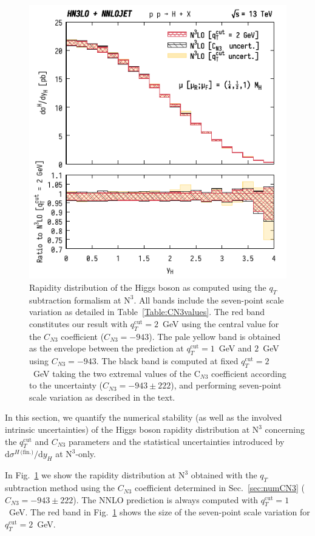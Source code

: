\documentclass[12pt]{article}
\DeclareRobustCommand{\qt}{\ensuremath{q_T}\xspace}
\DeclareRobustCommand{\qtcut}{\ensuremath{q_T^\mathrm{cut}}\xspace}
\DeclareRobustCommand{\rd}{\ensuremath{\mathrm{d}}}
\DeclareRobustCommand{\fin}{\text{(fin.)}\xspace}
\DeclareRobustCommand{\LO}{\text{LO}\xspace}
\DeclareRobustCommand{\N}[1]{\ensuremath{\text{N}^{#1}}} %
\begin{document}
\begin{figure}[tbh]
\centering
\includegraphics[width=.6\linewidth]{./JHEP_figures/yH_B02_only_N3LO_qTcut_uncert_CN3_uncert}
\caption{\label{fig:yHN3LOonly}{Rapidity distribution of the Higgs boson as computed using the $\qt$ subtraction formalism at \N3\LO. All bands include the seven-point scale variation as detailed in Table~\ref{Table:CN3values}. The red band constitutes our result with $\qtcut=2$~GeV using the central value for the $C_{N3}$ coefficient ($C_{N3}=-943$). The pale yellow band is obtained as the envelope between the prediction at $\qtcut=1$~GeV and $2$~GeV using $C_{N3}=-943$. The black band is computed at fixed $\qtcut=2$~GeV  taking the two extremal values of the C$_{N3}$ coefficient according to the uncertainty ($C_{N3}=-943 \pm 222$), and performing seven-point scale variation as described in the text.
}}
\end{figure}

In this section, we quantify the numerical stability (as well as the involved intrinsic uncertainties) of the Higgs boson rapidity distribution at \N3\LO concerning the $\qtcut$ and $C_{N3}$ parameters and the statistical uncertainties introduced by $\rd\sigma^{H\,\fin}/\rd y_H$ at \N3\LO-only.

In Fig.~\ref{fig:yHN3LOonly} we show the rapidity distribution at \N3\LO obtained with the $\qt$ subtraction method using the $C_{N3}$ coefficient determined in Sec.~\ref{sec:numCN3} ($C_{N3}=-943 \pm 222$). The NNLO prediction is always computed with $\qtcut=1$~GeV. 
The red band in Fig.~\ref{fig:yHN3LOonly} shows the size of the seven-point scale variation for $\qtcut=2$~GeV. 
\end{document}
